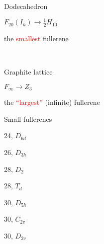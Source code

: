 \documentclass[%
pdf,
colorBG,
slideColor,
]{prosper}
\begin{document}
\begin{slide}{}
\begin{center}
\begin{minipage}[b]{5.5cm}
\centering
{}\par
Dodecahedron\par
$F_{20}(I_h)\rightarrow \frac{1}{2} H_{10}$\par
the \textcolor{red}{smallest} fullerene\par
\textcolor{white}{Bonjour}
\end{minipage}
\begin{minipage}[b]{5.5cm}
\centering
{}\par
Graphite lattice \par
$F_{\infty}\rightarrow Z_3$ \par
the \textcolor{red}{``largest''} (infinite) fullerene
\end{minipage}
\end{center}
\end{slide}




\begin{slide}{Small fullerenes}
\begin{center}
\begin{minipage}[b]{2.7cm}
\centering
{}\par
24, $D_{6d}$
\end{minipage}
\begin{minipage}[b]{2.7cm}
\centering
{}\par
26, $D_{3h}$
\end{minipage}
\begin{minipage}[b]{2.7cm}
\centering
{}\par
28, $D_{2}$
\end{minipage}
\begin{minipage}[b]{2.7cm}
\centering
{}\par
28, $T_{d}$
\end{minipage}
\begin{minipage}[b]{2.7cm}
\centering
{}\par
30, $D_{5h}$
\end{minipage}
\begin{minipage}[b]{2.7cm}
\centering
{}\par
30, $C_{2v}$
\end{minipage}
\begin{minipage}[b]{2.7cm}
\centering
{}\par
30, $D_{2v}$
\end{minipage}
\end{center}
\end{slide}
\end{document}
